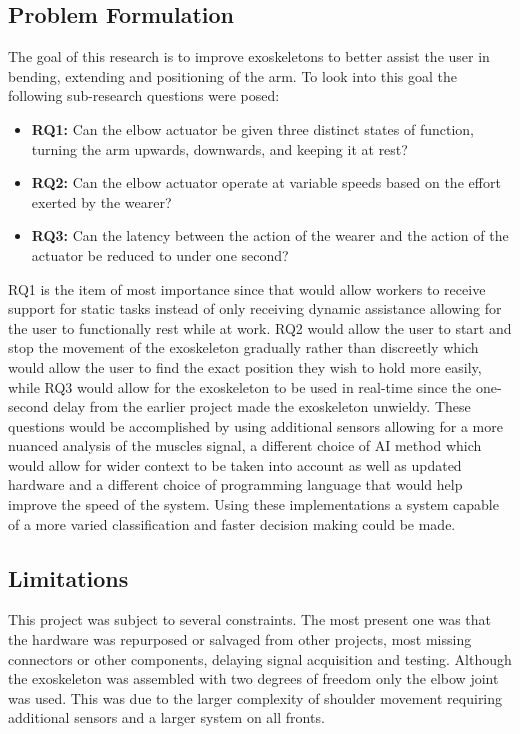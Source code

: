 \subsection{Problem Formulation}
The goal of this research is to improve exoskeletons to better assist the user in bending, extending and positioning of the arm.
To look into this goal the following sub-research questions were posed:
\begin{itemize}
        
    \item \textbf{RQ1:} Can the elbow actuator be given three distinct states of function, turning the arm upwards, downwards, and keeping it at rest?

    \item \textbf{RQ2:} Can the elbow actuator operate at variable speeds based on the effort exerted by the wearer?

    \item \textbf{RQ3:} Can the latency between the action of the wearer and the action of the actuator be reduced to under one second?

\end{itemize}
RQ1 is the item of most importance since that would allow workers to receive support for static tasks instead of only receiving dynamic
assistance allowing for the user to functionally rest while at work. RQ2 would allow the user to start and stop the
movement of the exoskeleton gradually rather than discreetly which would allow the user to find the exact position they
wish to hold more easily, while RQ3 would allow for the exoskeleton to be used in real-time since the one-second delay from the earlier project made the exoskeleton unwieldy. 
These questions would be accomplished by using additional sensors allowing for a more nuanced analysis of the muscles signal, 
a different choice of AI method which would allow for wider context to be taken into account as well as updated hardware and a different
choice of programming language that would help improve the speed of the system. Using these implementations a system capable of a more varied
classification and faster decision making could be made.

\subsection{Limitations}
This project was subject to several constraints. 
The most present one was that the hardware was repurposed or salvaged from other projects, most missing connectors or other components,
delaying signal acquisition and testing.
Although the exoskeleton was assembled with two degrees of freedom only the elbow joint was used.
This was due to the larger complexity of shoulder movement requiring additional sensors and a larger system on all
fronts.
